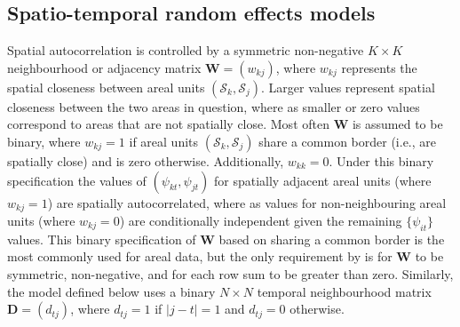 \documentclass[article, nojss]{jss}
\begin{document}
\subsection{Spatio-temporal random effects models}\label{section2.2}
Spatial autocorrelation is controlled by a symmetric non-negative $K\times K$ neighbourhood or adjacency matrix $\mathbf{W}=(w_{kj})$, where $w_{kj}$ represents the spatial closeness between areal units $(\mathcal{S}_k, \mathcal{S}_j)$. Larger values represent spatial closeness between the two areas in question, where as smaller or zero values correspond to areas that are not spatially close. Most often $\mathbf{W}$ is assumed to be binary, where $w_{kj}=1$ if areal units $(\mathcal{S}_k, \mathcal{S}_j)$ share a common border (i.e., are spatially close) and is zero otherwise. Additionally, $w_{kk}=0$. Under this binary specification the values of $(\psi_{kt}, \psi_{jt})$ for spatially adjacent areal units (where $w_{kj}=1$) are spatially autocorrelated, where as values for non-neighbouring areal units (where $w_{kj}=0$) are conditionally independent given the remaining $\{\psi_{it}\}$ values. This binary specification of $\mathbf{W}$ based on sharing a common border is the most commonly used for areal data, but the only requirement by  is for $\mathbf{W}$ to be symmetric, non-negative, and for each row sum to be greater than zero. Similarly, the model  defined below uses a binary $N\times N$ temporal neighbourhood matrix $\mathbf{D}=(d_{tj})$, where $d_{tj}=1$ if $|j-t|=1$ and $d_{tj}=0$ otherwise.\\ 
\end{document}
